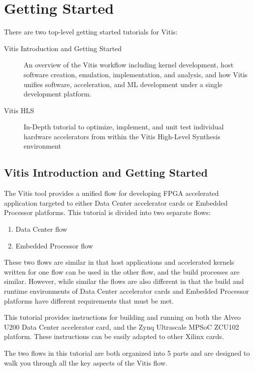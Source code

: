 \section{Getting Started}
There are two top-level getting started tutorials for Vitis:

\begin{description}
    \item [Vitis Introduction and Getting Started] An overview of the Vitis workflow including kernel development, host software creation, emulation, implementation, and analysis, and how Vitis unifies software, acceleration, and ML development under a single development platform.
    \item [Vitis HLS] In-Depth tutorial to optimize, implement, and unit test individual hardware accelerators from within the Vitis High-Level Synthesis environment
\end{description}

\subsection{Vitis Introduction and Getting Started}
The Vitis tool provides a unified flow for developing FPGA accelerated application targeted to either Data Center accelerator cards or Embedded Processor platforms. This tutorial is divided into two separate flows: 

\begin{enumerate}
    \item Data Center flow
    \item Embedded Processor flow
\end{enumerate}

These two flows are similar in that host applications and accelerated kernels written for one flow can be used in the other flow, and the build processes are similar. However, while similar the flows are also different in that the build and runtime environments of Data Center accelerator cards and Embedded Processor platforms have different requirements that must be met.

\par This tutorial provides instructions for building and running on both the Alveo U200 Data Center accelerator card, and the Zynq Ultrascale MPSoC ZCU102 platform. These instructions can be easily adapted to other Xilinx cards.

\par The two flows in this tutorial are both organized into 5 parts and are designed to walk you through all the key aspects of the Vitis flow.


